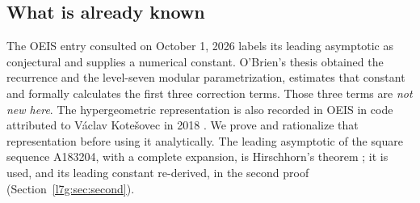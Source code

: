 \documentclass[11pt,letterpaper]{article}
\theoremstyle{remark}\newtheorem{remark}[theorem]{Remark}
\newcounter{l7gtrsavedeq}
\begin{document}
\subsection{What is already known}
The OEIS entry consulted on October 1, 2026 labels its leading asymptotic
as conjectural and supplies a numerical constant. O'Brien's thesis
\cite[\S8.4, pp.~63--67]{l7g:obrien} obtained the recurrence and the
level-seven modular parametrization, estimates that constant and formally
calculates the first three correction terms. Those three terms are
\emph{not new here}. The hypergeometric representation is also recorded
in OEIS in code attributed to V\'aclav Kote\v{s}ovec in 2018
\cite{l7g:oeis279619}. We prove and rationalize that representation before
using it analytically. The leading asymptotic of the square sequence
A183204, with a complete expansion, is Hirschhorn's theorem
\cite{l7g:hirschhorn}; it is used, and its leading constant re-derived, in
the second proof (Section~\ref{l7g:sec:second}).
\end{document}

